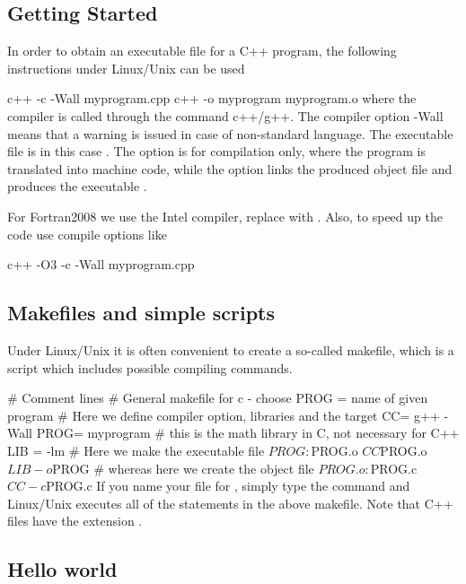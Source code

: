 \documentclass[%
twoside,                 %
final,                   %
10pt]{article}
\newenvironment{block_mdfboxadmon}[1][]{
\begin{block_mdfboxmdframed}[frametitle=#1]
}
{
\end{block_mdfboxmdframed}
}
\begin{document}
\subsection{Getting Started}


\begin{block_mdfboxadmon}
In order to obtain an executable file for a C++ program, the following
instructions under Linux/Unix can be used

\bsys
c++ -c -Wall myprogram.cpp
c++ -o myprogram myprogram.o
\esys
where the compiler is called through the command c++/g++. The compiler
option -Wall means that a warning is issued in case of non-standard
language. The executable file is in this case . The option
 is for compilation only, where the program is translated into machine code,
while the  option links the produced object file 
and produces the executable  .

For Fortran2008 we use the Intel compiler, replace  with .
Also, to speed up the code use compile options like

\bsys
c++ -O3 -c -Wall myprogram.cpp
\esys
\end{block_mdfboxadmon}



\subsection{Makefiles and simple scripts}

Under Linux/Unix it is often convenient to create a
so-called makefile, which is a script which includes possible
compiling commands.

\bcppcod
# Comment lines
# General makefile for c - choose PROG =   name of given program
# Here we define compiler option, libraries and the  target
CC= g++ -Wall
PROG= myprogram
# this is the math library in C, not necessary for C++
LIB = -lm
# Here we make the executable file
${PROG} :          ${PROG}.o
                   ${CC} ${PROG}.o ${LIB} -o ${PROG}
# whereas here we create the object file
${PROG}.o :       ${PROG}.c
                  ${CC} -c ${PROG}.c
\ecppcod
If you name your file for , simply type the command
 and Linux/Unix executes all of the statements in the above
makefile. Note that C++ files have the extension .

\subsection{Hello world}
\end{document}
